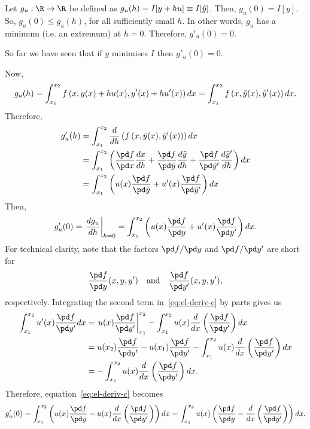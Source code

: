 Let $g_u : \R \to \R$ be defined as $g_{u}(h) = I[y+hu] \equiv I[\tilde{y}]$. Then, $g_{u}(0) = I[y]$. So, $g_{u}(0) \leq g_{u}(h)$, for all sufficiently small $h$. In other words, $g_u$ has a minimum (i.e. an extremum) at $h=0$. Therefore, $g'_{u}(0) = 0$.

So far we have seen that if $y$ minimises $I$ then $g'_{u}(0) = 0$.

Now,
\begin{equation}
    g_{u}(h) = \int_{x_1}^{x_2} f\left(x, y(x)+hu(x), y'(x)+hu'(x)\right) dx = \int_{x_1}^{x_2} f\left(x, \tilde{y}(x), \tilde{y}'(x)\right) dx.
    \label{eq:el-deriv-a}
\end{equation}
Therefore,
\begin{align}
    g'_{u}(h) &= \int_{x_1}^{x_2} \frac{d}{dh} \left( f\left(x, \yt(x), \yt'(x)\right) \right) dx\\
    &= \int_{x_1}^{x_2} \left( \frac{\pd f}{\pd x} \frac{dx}{dh} + \frac{\pd f}{\pd \yt} \frac{d\yt}{dh} + \frac{\pd f}{\pd \yt'} \frac{d\yt'}{dh} \right) dx\\
    &= \int_{x_1}^{x_2} \left( u(x) \frac{\pd f}{\pd \yt} + u'(x) \frac{\pd f}{\pd \yt'} \right) dx
    \label{eq:el-deriv-b}
\end{align}
Then,
\begin{equation}
    g'_{u}(0) = \left.\frac{dg_u}{dh}\right|_{h=0} = \int_{x_1}^{x_2} \left( u(x) \frac{\pd f}{\pd y} + u'(x) \frac{\pd f}{\pd y'} \right) dx.
    \label{eq:el-deriv-c}
\end{equation}
For technical clarity, note that the factors $\pd f / \pd y$ and $\pd f / \pd y'$ are short for
\begin{equation}
    \frac{\pd f}{\pd y} (x, y, y') \quad\text{and}\quad \frac{\pd f}{\pd y'} (x, y, y'),
\end{equation}
respectively. Integrating the second term in~\eqref{eq:el-deriv-c} by parts gives us
\begin{align}
    \int_{x_1}^{x_2} u'(x) \frac{\pd f}{\pd y'} dx
    &= \left. u(x) \frac{\pd f}{\pd y'} \right|_{x_1}^{x_2} - \int_{x_1}^{x_2} u(x) \frac{d}{dx}\left(\frac{\pd f}{\pd y'}\right) dx\\
    &= u(x_2) \frac{\pd f}{\pd y'} - u(x_1) \frac{\pd f}{\pd y'} - \int_{x_1}^{x_2} u(x) \frac{d}{dx}\left(\frac{\pd f}{\pd y'}\right) dx\\
    &= - \int_{x_1}^{x_2} u(x) \frac{d}{dx}\left(\frac{\pd f}{\pd y'}\right) dx.
\end{align}
Therefore, equation~\eqref{eq:el-deriv-c} becomes
\begin{equation}
    g'_{u}(0)
    = \int_{x_1}^{x_2} \left( u(x) \frac{\pd f}{\pd y} - u(x) \frac{d}{dx}\left(\frac{\pd f}{\pd y'}\right) \right) dx
    = \int_{x_1}^{x_2} u(x) \left( \frac{\pd f}{\pd y} - \frac{d}{dx}\left(\frac{\pd f}{\pd y'}\right) \right) dx.
\end{equation}
